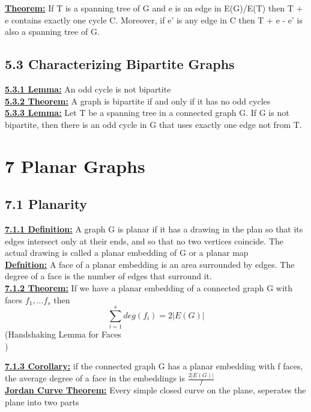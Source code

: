 \documentclass[12pt]{article}
\newcommand{\myt}[1]{\textbf{\underline{#1}}}
\begin{document}
	\myt{Theorem:} If T is a spanning tree of G and e is an edge in E(G)/E(T) then T + e  contains exactly one cycle C. Moreover, if e' is any edge in C then T + e - e' is also a spanning tree of G.\\
	
	\subsection*{5.3 Characterizing Bipartite Graphs}
	\myt{5.3.1 Lemma:} An odd cycle is not bipartite\\
	
	\myt{5.3.2 Theorem:} A graph is bipartite if and only if it has no odd cycles\\
	
	\myt{5.3.3 Lemma:} Let T be a spanning tree in a connected graph G. If G is not bipartite, then there is an odd cycle in G that uses exactly one edge not from T.\\
	
	\section*{7 Planar Graphs}
	\subsection*{7.1 Planarity}
	\myt{7.1.1 Definition:} A graph G is planar if it has a drawing in the plan so that its edges intersect only at their ends, and so that no two vertices coincide. The actual drawing is called a planar embedding of G or a planar map\\
	
	\myt{Defnition:} A face of a planar embedding is an area surrounded by edges. The degree of a face is the number of edges that surround it.\\
	
	\myt{7.1.2 Theorem:} If we have a planar embedding of a connected graph G with faces $f_1, ...f_s$ then\\
	$$\sum_{i=1}^{s}deg(f_i) = 2|E(G)|$$
	(Handshaking Lemma for Faces\\)
	
	\myt{7.1.3 Corollary:} if the connected graph G has a planar embedding with f faces, the average degree of a face in the embeddings is $\frac{2|E(G)|}{f}$\\
	
	\myt{Jordan Curve Theorem:} Every simple closed curve on the plane, seperates the plane into two parts\\
	
\end{document}
